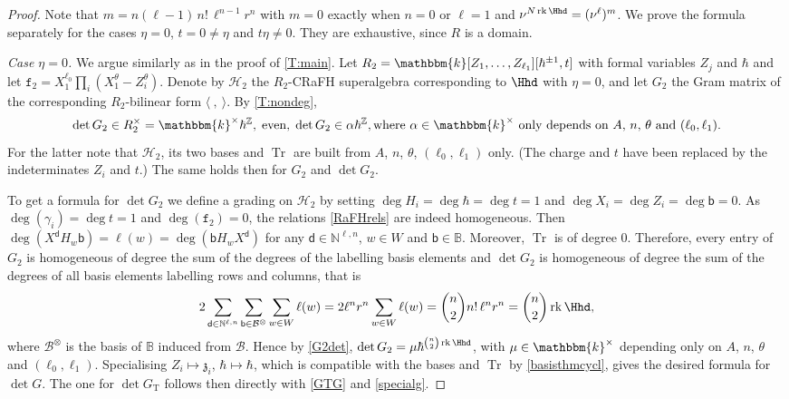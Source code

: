 \documentclass[a4paper,11pt]{amsart}
\let\<\langle
\let\>\rangle
\newcommand{\Tr}{\op{Tr}}
\newcommand{\T}{\op{T}}
\newcommand\cB{\mathcal{B}}
\newcommand\cBo{\cB^{\otimes}}
\numberwithin{equation}{subsection}
\theoremstyle{definition}
\theoremstyle{theorem}
\theoremstyle{remark}
\newcommand\kapp{{\mathfrak{z}}}
\newcommand\Sym{W}
\newcommand\bd{\mathsf{d}}
\newcommand\bb{\mathsf{b}}
\newcommand\op{\operatorname}
\newcommand\N{\mathbb{N}}
\newcommand\kk{\mathbbm{k}}
\newcommand\Z{\mathbb{Z}}
\newcommand{\Bo}{\mathbb{B}}
\begin{document}
\begin{proof}
  Note that $m=n(\ell-1)\,n!\,\ell^{n-1}r^{n}$ with $m=0$ exactly when
  $n=0$ or $\ell=1$ and $\nu^{N\op{rk}\Hhd}=(\nu^{\ell})^{m}$. We prove the formula separately for the cases  $\eta=0$, $t=0\neq\eta$ and $t\eta\neq0$. They are exhaustive, since $R$ is a domain.

 \noindent\emph{Case $\eta=0$.} We argue similarly as in the proof of \autoref{T:main}. Let $R_2=\kk[Z_1,\dots,Z_{\ell_1}][\hbar^{\pm1},t]$ with formal variables $Z_j$ and  $\hbar$ and let $\mathtt f_2=X_1^{\ell_0}\prod_i(X_1^{\theta}-Z_i^{\theta})$. Denote by
 $\mathcal H_2$ the  $R_2$-CRaFH superalgebra corresponding to $\Hhd$ with $\eta=0$, and let  $G_2$ the Gram matrix of the corresponding $R_2$-bilinear form $\<\ ,\ \>$. By  \autoref{T:nondeg},
\begin{equation}\label{G2det}
\det G_2\in R_2^{\times}=\kk^{\times}\hbar^{\Z}, \;\text{even},\;\det G_2\in\alpha\hbar^{\Z}, \text{where $\alpha\in\kk^{\times}$ only depends on  $A$, $n$, $\theta$ and $(\ell_0,\ell_1).$}
\end{equation}
For the latter  note that $\mathcal H_2$,
 its two bases and $\Tr$ are built from
 $A$, $n$, $\theta$, $(\ell_0,\ell_1)$ only. (The charge and $t$ have been
 replaced by the indeterminates $Z_i$ and $t$.) The same holds then for  $G_2$ and $\det G_2$.

To get a formula for  $\det G_2$ we define a grading on  $\mathcal H_2$ by setting
  $\deg H_i=\deg\hbar=\deg t=1$ and $\deg X_i=\deg Z_i=\deg\bb=0$. As
  $\deg(\gamma_i)=\deg t=1$ and $\deg(\mathtt f_2)=0$, the relations
  \autoref{RaFHrels} are indeed homogeneous. Then  $\deg(X^{\bd}H_w\bb)=\ell(w)=\deg(\bb H_wX^{\bd})$ for any $\bd\in\N^{\ell,n}$, $w\in\Sym$
  and $\bb\in\Bo$. Moreover, $\Tr$ is of  degree $0$. Therefore, every entry of $G_2$ is
 homogeneous of degree the sum of the degrees of the labelling basis elements and  $\det G_2$ is homogeneous of degree the sum of the degrees of all basis elements labelling rows and columns, that is
  \[
    2\sum_{\bd\in\N^{\ell,n}}\sum_{\bb\in\cBo}\sum_{w\in\Sym}\ell(w)
      =2\ell^{n}r^{n}\sum_{w\in\Sym}\ell(w)
      =\binom{n}{2}n!\,\ell^{n}r^{n}=\binom{n}{2}\op{rk}\Hhd,
  \]
  where $\cBo$ is the basis of $\Bo$ induced from $\cB$. Hence by \autoref{G2det},
  $\det G_2=\mu\hbar^{\binom{n}{2}\op{rk}\Hhd}$, with $\mu\in\kk^{\times}$
  depending only on $A$, $n$, $\theta$ and $(\ell_0,\ell_1)$. Specialising
  $Z_i\mapsto\kapp_i$, $\hbar\mapsto\hbar$, which is compatible with the bases and $\Tr$ by
  \autoref{basisthmcycl}, gives the desired formula for $\det G$. The one for $\det G_{\T}$ follows then directly with
   \autoref{GTG} and  \autoref{specialg}.


\end{proof}
\end{document}
